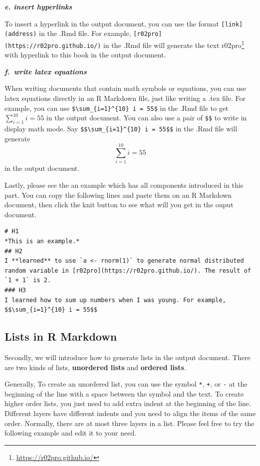 \documentclass[
]{book}
\renewcommand{\href}[2]{#2\footnote{\url{#1}}}
\begin{document}
\textbf{\emph{e. insert hyperlinks}}

To insert a hyperlink in the output document, you can use the format \texttt{{[}link{]}(address)} in the .Rmd file. For example, \texttt{{[}r02pro{]}(https://r02pro.github.io/)} in the .Rmd file will generate the text \href{https://r02pro.github.io/}{r02pro} with hyperlink to this book in the output document.

\textbf{\emph{f.~write latex equations}}

When writing documents that contain math symbols or equations, you can use latex equations directly in an R Markdown file, just like writing a .tex file. For example, you can use \texttt{\$\textbackslash{}sum\_\{i=1\}\^{}\{10\}\ i\ =\ 55\$} in the .Rmd file to get \(\sum_{i=1}^{10} i= 55\) in the output document. You can also use a pair of \texttt{\$\$} to write in display math mode. Say \texttt{\$\$\textbackslash{}sum\_\{i=1\}\^{}\{10\}\ i\ =\ 55\$\$} in the .Rmd file will generate
\[\sum_{i=1}^{10} i = 55\] in the output document.

Lastly, please see the an example which has all components introduced in this part. You can copy the following lines and paste them on an R Markdown document, then click the knit button to see what will you get in the ouput document.

\begin{verbatim}
# H1
*This is an example.*
## H2
I **learned** to use `a <- rnorm(1)` to generate normal distributed random variable in [r02pro](https://r02pro.github.io/). The result of `1 + 1` is 2.
### H3
I learned how to sum up numbers when I was young. For example,
$$\sum_{i=1}^{10} i = 55$$
\end{verbatim}

\hypertarget{lists-in-r-markdown}{%
\subsection{Lists in R Markdown}\label{lists-in-r-markdown}}

Secondly, we will introduce how to generate lists in the output document. There are two kinds of lists, \textbf{unordered lists} and \textbf{ordered lists}.

Generally, To create an unordered list, you can use the symbol \texttt{*}, \texttt{+}, or \texttt{-} at the beginning of the line with a space between the symbol and the text. To create higher order lists, you just need to add extra indent at the beginning of the line. Different layers have different indents and you need to align the items of the same order. Normally, there are at most three layers in a list. Please feel free to try the following example and edit it to your need.
\end{document}
